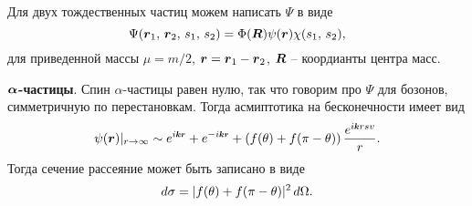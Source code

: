 

Для двух тождественных частиц можем написать $\Psi$ в виде
\begin{equation*}
	\Psi(\mbox{\boldmath $r$}_1,\, \mbox{\boldmath $r$}_2,\, s_1,\, s_2) = \Phi(\mbox{\boldmath $R$}) \psi(\mbox{\boldmath $r$}) \chi(s_1,\, s_2),
\end{equation*}
для приведенной массы $\mu = m/2$, $\mbox{\boldmath $r$} = \mbox{\boldmath $r$}_1 - \mbox{\boldmath $r$}_2$, $\mbox{\boldmath $R$}$ -- коордианты центра масс. 

\textbf{$\mbox{\boldmath $\alpha$}$-частицы}. Спин $\alpha$-частицы равен нулю, так что говорим про $\Psi$ для бозонов, симметричную по перестановкам. Тогда асмиптотика на бесконечности имеет вид
\begin{equation*}
	\psi(\vc{r})|_{r\to \infty} \sim e^{i \smallvc{k} \smallvc{r}} + e^{- i \smallvc{k} \smallvc{r}} + \left(
		f(\theta) + f(\pi-\theta)
	\right) \frac{e^{i \smallvc{k} r
	sv}}{r}.
\end{equation*}
Тогда сечение рассеяние может быть записано в виде
\begin{equation*}
	d \sigma = |f(\theta) + f(\pi-\theta)|^2 \, d \Omega.
\end{equation*}


